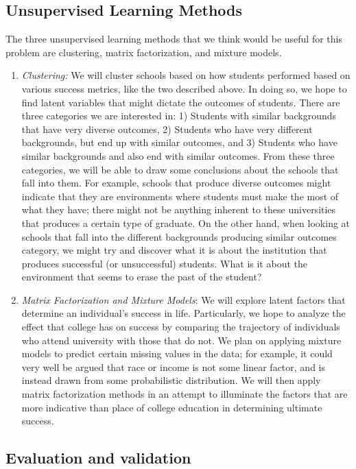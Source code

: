 \documentclass{article} %
\begin{document}
\subsection{Unsupervised Learning Methods}
The three unsupervised learning methods that we think would be useful for this problem are clustering, matrix factorization, and mixture models.
\begin{enumerate}
\item \textit{Clustering:} We will cluster schools based on how students performed based on various success metrics, like the two described above.  In doing so, we hope to find latent variables that might dictate the outcomes of students.  There are three categories we are interested in: 1) Students with similar backgrounds that have very diverse outcomes, 2) Students who have very different backgrounds, but end up with similar outcomes, and 3) Students who have similar backgrounds and also end with similar outcomes.  From these three 
categories, we will be able to draw some conclusions about the schools that fall into 
them.  For example, schools that produce diverse outcomes might indicate that they are environments where students must make the most of what they have; there might not be anything inherent to these universities that produces a certain type of graduate.  On the other hand, when looking at schools that fall into the different backgrounds producing similar outcomes category, we might try and discover what it is about the institution that produces successful (or unsuccessful) students.  What is it about the environment that seems to erase the past of the student?
\item \textit{Matrix Factorization and Mixture Models}: We will explore latent factors that determine an individual's success in life. Particularly, we hope to analyze the effect that college has on success by comparing the trajectory of individuals who attend university with those that do not. We plan on applying mixture models to predict certain missing values in the data; for example, it could very well be argued that race or income is not some linear factor, and is instead drawn from some probabilistic distribution. We will then apply matrix factorization methods in an attempt to illuminate the factors that are more indicative than place of college education in determining ultimate success. 
\end{enumerate}

\subsection{Evaluation and validation}
\end{document}
